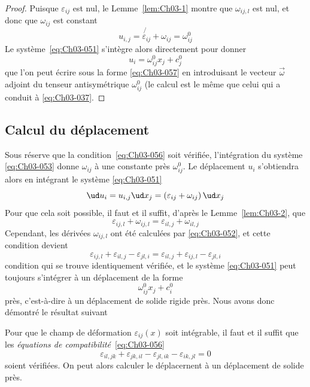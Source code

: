 \begin{proof}
    Puisque $\varepsilon_{ij}$ est nul, le Lemme~\ref{lem:Ch03-1} montre que $\omega_{ij,l}$ est nul, et donc que $\omega_{ij}$ est constant
    \begin{equation*}
        u_{i,j} = \not{\varepsilon_{ij}} + \omega_{ij} = \omega_{ij}^0
    \end{equation*}
    Le système~\eqref{eq:Ch03-051} s'intègre alors directement pour donner
    \begin{equation*}
        u_i = \omega_{ij}^0 x_j + c_{j}^0
    \end{equation*}
    que l'on peut écrire sous la forme \eqref{eq:Ch03-057} en introduisant le vecteur $\vec{\omega}$ adjoint du tenseur antisymétrique $\omega_{ij}^0$ (le calcul est le même que celui qui a conduit à \eqref{eq:Ch03-037}.
\end{proof}
\subsection{Calcul du déplacement} \label{ssec:Ch03-3.2}
Sous réserve que la condition~\eqref{eq:Ch03-056} soit vérifiée, l'intégration du système \eqref{eq:Ch03-053} donne $\omega_{ij}$ à une constante près $\omega_{ij}^0$.
Le déplacement $u_i$ s'obtiendra alors en intégrant le système \eqref{eq:Ch03-051}
\begin{equation*}
    \ud u_i = u_{i,j} \ud x_j = \left( \varepsilon_{ij} + \omega_{ij} \right) \ud x_j
\end{equation*}
Pour que cela soit possible, il faut et il suffit, d'après le Lemme~\ref{lem:Ch03-2}, que
\begin{equation*}
    \varepsilon_{ij,l} + \omega_{ij,l} = \varepsilon_{il,j} + \omega_{il,j}
\end{equation*}
Cependant, les dérivées $\omega_{ij,l}$ ont été calculées par \eqref{eq:Ch03-052}, et cette condition devient 
\begin{equation*}
    \varepsilon_{ij,l} + \varepsilon_{il,j} - \varepsilon_{jl,i} = \varepsilon_{il,j} + \varepsilon_{ij,l} - \varepsilon_{jl,i}
\end{equation*}
condition qui se trouve identiquement vérifiée, et le système \eqref{eq:Ch03-051} peut toujours s'intégrer à un déplacement de la forme 
\begin{equation*}
    \omega_{ij}^0 x_j + c_i^0
\end{equation*}
près, c'est-à-dire à un déplacement de solide rigide près.
Nous avons donc démontré le résultat suivant
\begin{thm} \label{thm:Ch03-3}
    Pour que le champ de déformation $\varepsilon_{ij}(x)$ soit intégrable, il faut et il suffit que les \emph{équations de compatibilité}~\eqref{eq:Ch03-056}
    \begin{equation*}
        \varepsilon_{il,jk} + \varepsilon_{jk,il} - \varepsilon_{jl,ik} - \varepsilon_{ik,jl} = 0
    \end{equation*}
    soient vérifiées.
    On peut alors calculer le déplacernent à un déplacement de solide près.
\end{thm}

